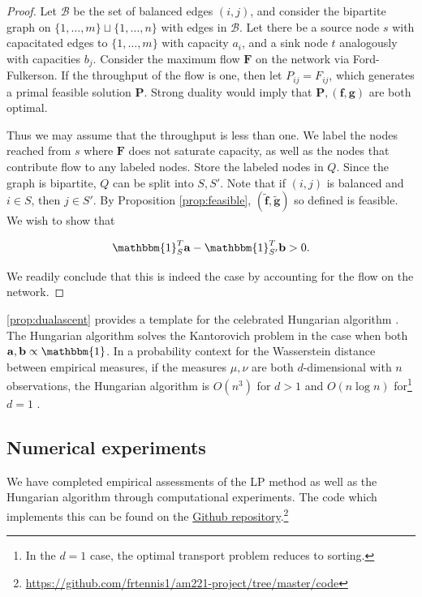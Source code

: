 \documentclass[11pt,reqno]{amsart}
\renewcommand{\b}{\mathbf}
\newcommand{\one}{\mathbbm{1}}
\theoremstyle{definition}
\theoremstyle{remark}
\begin{document}
\begin{proof}
    Let $\mathcal B$ be the set of balanced edges $(i,j)$, and consider the
    bipartite graph on $\{1,\ldots,m\} \sqcup \{1,\ldots,n\}$ with edges in
    $\mathcal B$. Let there be a source node $s$ with capacitated edges to
    $\{1,\ldots,m\}$ with capacity $a_i$, and a sink node $t$ analogously with
    capacities $b_j$. Consider the maximum flow $\b F$ on the network via
    Ford-Fulkerson. If the throughput of the flow is one, then let $P_ {ij} =
    F_{ij}$, which generates a primal feasible solution $\b P$. Strong duality
    would imply that $\b P, (\b f, \b g)$ are both optimal.
    
    Thus we may assume that the throughput is less than one. We label the nodes
    reached from $s$ where $\b F$ does not saturate capacity, as well as the
    nodes that contribute flow to any labeled nodes. Store the labeled nodes in
    $Q$. Since the graph is bipartite, $Q$ can be split into $S,S'$. Note that
    if $(i,j)$ is balanced and $i\in S$, then $j\in S'$. By Proposition
    \cref{prop:feasible}, $(\tilde {\b f}, \tilde {\b g})$ so defined is
    feasible. We wish to show that
    
    \[ \one_S^T \b a - \one_{S'}^T \b b > 0. \]

    We readily conclude that this is indeed the case by accounting for the
    flow on the network.
\end{proof}

\cref{prop:dualascent} provides a template for the celebrated Hungarian
algorithm \cite{kuhn2010hungarian}. The Hungarian algorithm solves the
Kantorovich problem in the case when both $\b a, \b b \propto \one$. In a
probability context for the Wasserstein distance between empirical measures, if
the measures $\mu, \nu$ are both $d$-dimensional with $n$ observations, the
Hungarian algorithm is $O(n^3)$ for $d>1$ and $O(n\log n)$ for\footnote{In the
$d=1$ case, the optimal transport problem reduces to sorting.} $d = 1$
\cite{bernton2017inference}.

\subsection{Numerical experiments}

We have completed empirical assessments of the LP method as well as the
Hungarian algorithm through computational experiments. The code which implements
this can be found on the
\href{https://github.com/frtennis1/am221-project/tree/master/code}{Github
repository}.\footnote{\url{https://github.com/frtennis1/am221-project/tree/master/code}}
\end{document}
